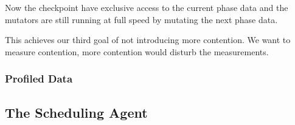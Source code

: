Now the checkpoint have exclusive access to the current phase data and the mutators are still running at full speed by mutating the next phase data.

This achieves our third goal of not introducing more contention. We want to measure contention, more contention would disturb the measurements.

\subsubsection{Profiled Data} \label{sec:agentprof}


\subsection{The Scheduling Agent}


\fi



